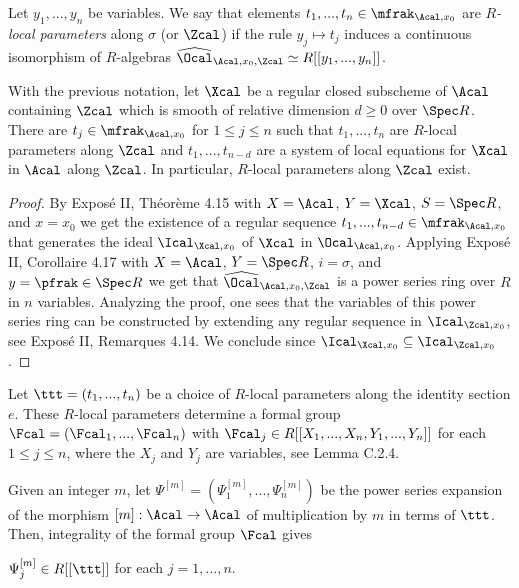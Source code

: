  Let $y_1,...,y_n$ be variables. We say that elements $t_1,...,t_n\in \mfrak_{\Acal,x_0}$  are \emph{$R$-local parameters} along $\sigma$ (or $\Zcal$) if the rule $y_j\mapsto t_j$ induces a continuous isomorphism of $R$-algebras $\widehat{\Ocal}_{\Acal,x_0,\Zcal}\simeq R[[y_1,...,y_n]]$.
\begin{lemma}
\notready\label{LemmaChoiceLocParam} With the previous notation, let $\Xcal$ be a regular closed subscheme of $\Acal$ containing $\Zcal$ which is smooth of relative dimension $d\ge 0$ over $\Spec R$.  There are $t_j\in \mfrak_{\Acal,x_0}$ for $1\le j\le n$ such that $t_1,...,t_n$ are $R$-local parameters along $\Zcal$ and $t_1,...,t_{n-d}$ are a system of local equations for $\Xcal$ in $\Acal$ along $\Zcal$. In particular, $R$-local parameters along $\Zcal$ exist.
\end{lemma}
\begin{proof} By \cite{SGA1} Expos\'e II, Th\'eor\`eme 4.15 with $X=\Acal$, $Y=\Xcal$, $S=\Spec R$, and $x=x_0$  we get the existence of  a regular sequence $t_1,...,t_{n-d}\in \mfrak_{\Acal,x_0}$ that generates the ideal $\Ical_{\Xcal, x_0}$ of $\Xcal$ in $\Ocal_{\Acal, x_0}$. Applying \cite{SGA1} Expos\'e II, Corollaire 4.17 with $X=\Acal$, $Y=\Spec R$, $i=\sigma$, and $y=\pfrak\in \Spec R$ we get that  $\widehat{\Ocal}_{\Acal,x_0,\Zcal}$ is a power series ring over $R$ in $n$ variables. Analyzing the proof, one sees that the variables of this power series ring can be constructed by extending any regular sequence in $\Ical_{\Zcal, x_0}$, see \cite{SGA1} Expos\'e II, Remarques  4.14. We conclude since $\Ical_{\Xcal,x_0}\subseteq \Ical_{\Zcal,x_0}$.
\end{proof}
Let $\ttt=(t_1,...,t_n)$ be a choice of $R$-local parameters along the identity section $e$. These $R$-local parameters determine a formal group $\Fcal=(\Fcal_1,...,\Fcal_n)$ with $\Fcal_j\in R[[X_1,...,X_n,Y_1,...,Y_n]]$ for each $1\le j\le n$, where the $X_j$ and $Y_j$ are variables, see \cite{SilvermanHindry} Lemma C.2.4.

Given an integer $m$, let $\Psi^{[m]}=(\Psi^{[m]}_1,...,\Psi^{[m]}_n)$ be the power series expansion of the morphism $[m]:\Acal\to \Acal$ of multiplication by $m$ in terms of $\ttt$. Then, integrality of the formal group $\Fcal$ gives
\begin{lemma}
\notready\label{LemmaPsiR} $\Psi^{[m]}_j\in R[[\ttt]]$ for each $j=1,...,n$.
\end{lemma}

